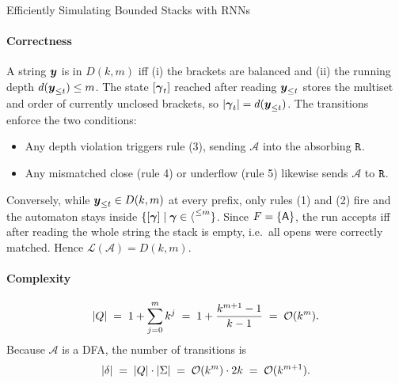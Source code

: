 \begin{question}{Efficiently Simulating Bounded Stacks with RNNs}
\begin{subquestion}
    \paragraph{Correctness} A string $\str$ is in $D(k, m)$ iff (i) the brackets are balanced and (ii) the running depth $d(\str_{\le t}) \le m$.
    The state $[\stackseq_t]$ reached after reading $\str_{\le t}$ stores the multiset and order of currently unclosed brackets, so $|\stackseq_t| = d(\str_{\le t})$. 
    The transitions enforce the two conditions:
    \begin{itemize}
        \item Any depth violation triggers rule (3), sending $\mathcal{A}$ into the absorbing $\rejectState$.
        \item Any mismatched close (rule 4) or underflow (rule 5) likewise sends $\mathcal{A}$ to $\rejectState$.
    \end{itemize}
    Conversely, while $\str_{\le t} \in D(k, m)$ at every prefix, only rules (1) and (2) fire and the automaton stays inside $\{[\stackseq] \mid \stackseq \in \openBr{}^{\le m}\}$. 
    Since $\final = \{\acceptState\}$, the run accepts iff after reading the whole string the stack is empty, i.e.\ all opens were correctly matched. Hence $\mathcal{L}(\mathcal{A}) = D(k, m)$.

    \paragraph{Complexity}
    \[
        |\states| \;=\; 1 + \sum_{j=0}^{m} k^{j} \;=\; 1 + \frac{k^{m+1} - 1}{k - 1} \;=\; \mathcal{O}(k^{m}).
    \]
    Because $\mathcal{A}$ is a DFA, the number of transitions is
    \[
        |\trans| \;=\; |\states| \cdot |\alphabet| \;=\; \mathcal{O}(k^{m}) \cdot 2k \;=\; \mathcal{O}(k^{m+1}).
    \]
\end{subquestion}


\end{question}
